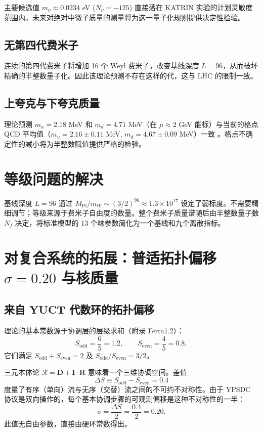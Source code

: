 \documentclass[12pt,a4paper]{article}
\begin{document}
	主要候选值 $m_\nu \approx 0.0234$ eV ($N_\nu = -125$) 直接落在 KATRIN 实验的计划灵敏度范围内。未来对绝对中微子质量的测量将为这一量子化规则提供决定性检验。
	
	
	
	\subsection{无第四代费米子}
	
	连续的第四代费米子将增加 16 个 Weyl 费米子，改变基线深度 $L=96$，从而破坏精确的半整数量子化。因此该理论预测不存在这样的代，这与 LHC 的限制一致。
	
	\subsection{上夸克与下夸克质量}
	
	理论预测 $m_u = 2.18$ MeV 和 $m_d = 4.71$ MeV（在 $\mu \approx 2$ GeV 能标）与当前的格点 QCD 平均值（$m_u = 2.16 \pm 0.11$ MeV, $m_d = 4.67 \pm 0.09$ MeV）一致 \cite{PDG2024}。格点不确定性的减小将为半整数赋值提供严格的检验。
	
	\section{等级问题的解决}
	
	基线深度 $L=96$ 通过 $M_{\mathrm{Pl}}/m_W \sim (3/2)^{96} \approx 1.3\times10^{17}$ 设定了弱标度。不需要精细调节；等级来源于费米子自由度的数量。整个费米子质量谱随后由半整数量子数 $N_f$ 决定，将标准模型的 13 个味参数简化为一个基线和九个离散指标。
	
	\section{对复合系统的拓展：普适拓扑偏移 \(\sigma=0.20\) 与核质量}
	\label{sec:sigma_nuclear}
	
	\subsection{来自 YUCT 代数环的拓扑偏移}
	
	理论的基本常数源于协调层的层级求和（附录 Ferra1.2）：
	\[
	S_{\mathrm{odd}} = \frac{6}{5}=1.2,\qquad S_{\mathrm{even}} = \frac{4}{5}=0.8,
	\]
	它们满足 $S_{\mathrm{odd}}+S_{\mathrm{even}}=2$ 及 $S_{\mathrm{odd}}/S_{\mathrm{even}}=3/2$。
	
	三元本体论 $\mathcal{R} = \mathbf{D} + \mathbf{I}\!\cdot\!\mathbf{R}$ 意味着一个三维协调空间。差值
	\[
	\Delta S \equiv S_{\mathrm{odd}} - S_{\mathrm{even}} = 0.4
	\]
	度量了有序（单向）流与无序（交替）流之间的不可约不对称性。由于 YPSDC 协议是双向操作的，每个基本协调步骤的可观测偏移是这种不对称性的一半：
	\begin{equation}
		\boxed{\sigma = \frac{\Delta S}{2} = \frac{0.4}{2} = 0.20.}
		\label{eq:sigma_fermion_paper}
	\end{equation}
	此值无自由参数，直接由硬环常数得出。
	
\end{document}

